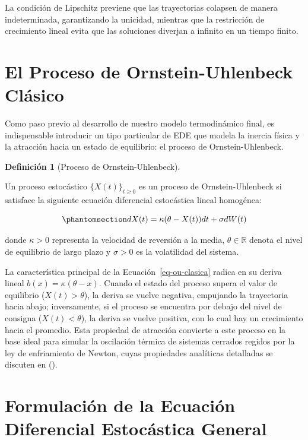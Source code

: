 \documentclass[
  spanish,
  letterpaper,
  DIV=11,
  numbers=noendperiod]{scrreprt}
\theoremstyle{plain}
\theoremstyle{definition}
\newtheorem{definition}{Definición}[chapter]
\theoremstyle{remark}
\begin{document}
La condición de Lipschitz previene que las trayectorias colapsen de
manera indeterminada, garantizando la unicidad, mientras que la
restricción de crecimiento lineal evita que las soluciones diverjan a
infinito en un tiempo finito.

\section{El Proceso de Ornstein-Uhlenbeck
Clásico}\label{el-proceso-de-ornstein-uhlenbeck-cluxe1sico}

Como paso previo al desarrollo de nuestro modelo termodinámico final, es
indispensable introducir un tipo particular de EDE que modela la inercia
física y la atracción hacia un estado de equilibrio: el proceso de
Ornstein-Uhlenbeck.

\begin{definition}[Proceso de
Ornstein-Uhlenbeck]\protect\hypertarget{def-ou-clasico}{}\label{def-ou-clasico}

Un proceso estocástico \(\{X(t)\}_{t \ge 0}\) es un proceso de
Ornstein-Uhlenbeck si satisface la siguiente ecuación diferencial
estocástica lineal homogénea:

\begin{equation}\phantomsection\label{eq-ou-clasica}{
dX(t) = \kappa (\theta - X(t)) dt + \sigma dW(t)
}\end{equation}

donde \(\kappa > 0\) representa la velocidad de reversión a la media,
\(\theta \in \mathbb{R}\) denota el nivel de equilibrio de largo plazo y
\(\sigma > 0\) es la volatilidad del sistema.

\end{definition}

La característica principal de la Ecuación~\ref{eq-ou-clasica} radica en
su deriva lineal \(b(x) = \kappa(\theta - x)\). Cuando el estado del
proceso supera el valor de equilibrio (\(X(t) > \theta\)), la deriva se
vuelve negativa, empujando la trayectoria hacia abajo; inversamente, si
el proceso se encuentra por debajo del nivel de consigna
(\(X(t) < \theta\)), la deriva se vuelve positiva, con lo cual hay un
crecimiento hacia el promedio. Esta propiedad de atracción convierte a
este proceso en la base ideal para simular la oscilación térmica de
sistemas cerrados regidos por la ley de enfriamiento de Newton, cuyas
propiedades analíticas detalladas se discuten en
().

\section{Formulación de la Ecuación Diferencial Estocástica
General}\label{formulaciuxf3n-de-la-ecuaciuxf3n-diferencial-estocuxe1stica-general}
\end{document}
